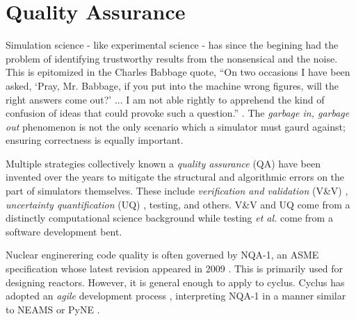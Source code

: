 \section{Quality Assurance}
%

%


Simulation science - like experimental science - has since the begining had the 
problem of identifying trustworthy results from the nonsensical and the noise.
This is epitomized in the Charles Babbage quote, ``On two occasions I have been asked, 
`Pray, Mr. Babbage, if you put into the machine wrong figures, will the right 
answers come out?' ... I am not able rightly to apprehend the kind of confusion 
of ideas that could provoke such a question.'' \cite{babbage2011passages}. 
The \emph{garbage in, garbage out} phenomenon is not the only scenario which a
simulator must gaurd against; ensuring correctness is equally important.

Multiple strategies collectively known a \emph{quality assurance} (QA) have 
been invented over the years to mitigate the structural and algorithmic errors
on the part of simulators themselves. These include \emph{verification and validation}
(V\&V) \cite{boehm1989software}, \emph{uncertainty quantification} (UQ) 
\cite{sacks1989design}, testing, and others. V\&V and UQ come from 
a distinctly computational science background while testing \emph{et al.} come from 
a software development bent. 

Nuclear enginerering code quality is often governed by NQA-1, an ASME specification 
whose latest revision appeared in 2009 \cite{NQA-1a-2009}. This is primarily 
used for designing reactors. However, it is general enough to apply to 
cyclus. Cyclus has adopted an \emph{agile} development process \cite{larman2004agile}, 
interpreting NQA-1 in a manner similar to NEAMS \cite{neams-qa} or PyNE \cite{pyne-vv}. 

